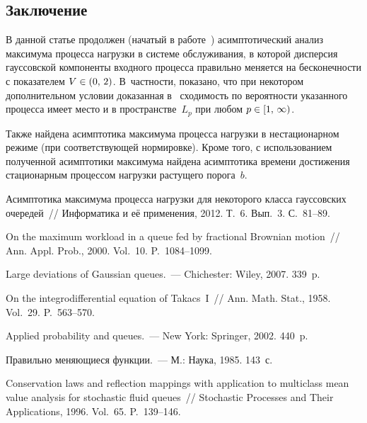 \begin{multicols}{2}
\section{Заключение}

В данной статье  продолжен (начатый в работе~\cite{Lukashenko})
асимптотический анализ максимума процесса нагрузки в системе
обслуживания, в которой дисперсия гауссовской компоненты входного
процесса  правильно меняется  на бесконечности с показателем
$V\hm\in(0,\,2)$.
  В~частности, показано, что при некотором дополнительном  условии
 доказанная в~\cite{Lukashenko} сходимость по вероятности
 указанного процесса  имеет место и
в пространстве~$L_p$  при любом $p\hm\in [1,\,\infty)$. 

Также найдена
асимптотика максимума процесса нагрузки в нестационарном режиме (при
соответствующей нормировке). 
Кроме того, с использованием полученной
асимптотики максимума  найдена асимптотика  времени достижения
стационарным процессом нагрузки растущего   порога~$b$.

{\small\frenchspacing
{%
\begin{thebibliography}{99}

 Асимптотика максимума
процесса нагрузки для некоторого класса гауссовских очередей~//
Информатика и её применения, 2012. Т.~6. Вып.~3. С.~81--89.

 On the maximum workload in a queue fed
by fractional Brownian motion~// Ann. Appl. Prob., 2000. Vol.~10.
P.~1084--1099.

 Large deviations of Gaussian queues.~---
Chichester: Wiley, 2007. 339~p.



 On the integrodifferential equation of Takacs~I~// 
Ann. Math. Stat., 1958. Vol.~29. P.~563--570.

  Applied probability and queues.~--- New York: Springer, 2002. 440~p.

 Правильно меняющиеся функции.~--- М.: Наука, 1985.
143~с.

Conservation laws and reflection mappings with application to
multiclass mean value analysis for stochastic fluid queues~// 
Stochastic Processes and Their Applications, 1996. Vol.~65.
P.~139--146.


\end{thebibliography}}}
\end{multicols}
